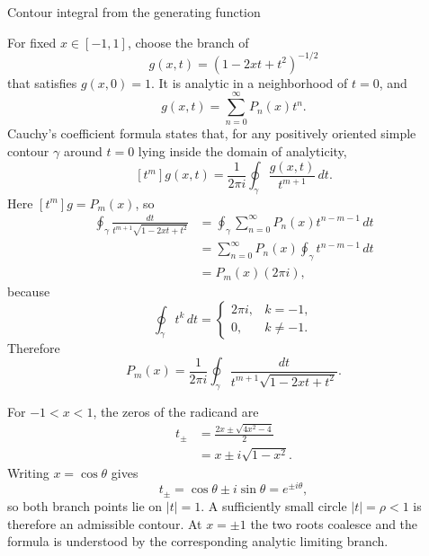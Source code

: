 \documentclass[11pt]{beamer}
\begin{document}
\begin{frame}[allowframebreaks]{Contour integral from the generating function}
\footnotesize

For fixed $x\in[-1,1]$, choose the branch of
\[
  g(x,t)=(1-2xt+t^2)^{-1/2}
\]
that satisfies $g(x,0)=1$. It is analytic in a neighborhood of $t=0$, and
\[
  g(x,t)=\sum_{n=0}^{\infty}P_n(x)t^n.
\]
Cauchy's coefficient formula states that, for any positively oriented simple contour
$\gamma$ around $t=0$ lying inside the domain of analyticity,
\[
  [t^m]g(x,t)=\frac{1}{2\pi i}\oint_\gamma\frac{g(x,t)}{t^{m+1}}\,dt.
\]
Here $[t^m]g=P_m(x)$, so
\begin{align*}
  \oint_\gamma\frac{dt}{t^{m+1}\sqrt{1-2xt+t^2}}
   &=\oint_\gamma\sum_{n=0}^{\infty}P_n(x)t^{n-m-1}\,dt\\
   &=\sum_{n=0}^{\infty}P_n(x)
       \oint_\gamma t^{n-m-1}\,dt\\
   &=P_m(x)(2\pi i),
\end{align*}
because
\[
  \oint_\gamma t^k\,dt
  =\begin{cases}
      2\pi i,&k=-1,\\
      0,&k\ne-1.
    \end{cases}
\]
Therefore
\begin{equation}
  P_m(x)=\frac{1}{2\pi i}
  \oint_\gamma\frac{dt}{t^{m+1}\sqrt{1-2xt+t^2}}.
  \label{eq:legendre-contour}
\end{equation}

For $-1<x<1$, the zeros of the radicand are
\begin{align*}
  t_{\pm}
   &=\frac{2x\pm\sqrt{4x^2-4}}{2}\\
   &=x\pm i\sqrt{1-x^2}.
\end{align*}
Writing $x=\cos\theta$ gives
\[
  t_\pm=\cos\theta\pm i\sin\theta=e^{\pm i\theta},
\]
so both branch points lie on $|t|=1$. A sufficiently small circle $|t|=\rho<1$ is
therefore an admissible contour. At $x=\pm1$ the two roots coalesce and the formula is
understood by the corresponding analytic limiting branch.
\end{frame}
\end{document}
